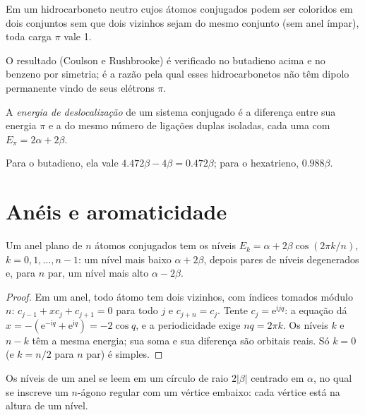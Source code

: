 \begin{proposition}\label{prop:b2:huckel:alternant}
Em um hidrocarboneto neutro cujos átomos conjugados podem ser coloridos em dois
conjuntos sem que dois vizinhos sejam do mesmo conjunto (sem anel ímpar), toda
carga $\pi$ vale 1.
\end{proposition}

\admitted

O resultado (Coulson e Rushbrooke) é verificado no butadieno acima e no benzeno
por simetria; é a razão pela qual esses hidrocarbonetos não têm dipolo
permanente vindo de seus elétrons $\pi$.

\begin{definition}\label{def:b2:huckel:delocalisation}
A \emph{energia de deslocalização} de um sistema
conjugado é a diferença entre sua energia $\pi$ e a do mesmo número de
ligações duplas isoladas, cada uma com $E_\pi = 2\alpha + 2\beta$.
\end{definition}

Para o butadieno, ela vale $4.472\beta - 4\beta = 0.472\beta$; para o hexatrieno, $0.988\beta$.

\section{Anéis e aromaticidade}

\begin{theorem}\label{thm:b2:huckel:ring}
Um anel plano de $n$ átomos conjugados tem os níveis $E_k = \alpha + 2\beta\cos(2\pi k/n)$,
$k = 0, 1, \dots, n - 1$: um nível mais baixo $\alpha + 2\beta$, depois pares de
níveis degenerados e, para $n$ par, um nível mais alto $\alpha - 2\beta$.
\end{theorem}

\begin{proof}
Em um anel, todo átomo tem dois vizinhos, com índices tomados módulo $n$:
$c_{j-1} + xc_j + c_{j+1} = 0$ para todo $j$ e $c_{j+n} = c_j$. Tente $c_j = \mathrm e^{\mathrm
i jq}$: a equação dá $x = -(\mathrm e^{-\mathrm iq} + \mathrm e^{\mathrm iq}) = -2\cos q$,
e a periodicidade exige $nq = 2\pi k$. Os níveis $k$ e $n - k$ têm a mesma
energia; sua soma e sua diferença são orbitais reais. Só $k = 0$ (e $k = n/2$
para $n$ par) é simples.
\end{proof}

\begin{corollary}\label{cor:b2:huckel:frost}
Os níveis de um anel se leem em um círculo de raio $2|\beta|$ centrado em $\alpha$,
no qual se inscreve um $n$-ágono regular com um vértice embaixo: cada vértice
está na altura de um nível.
\end{corollary}

